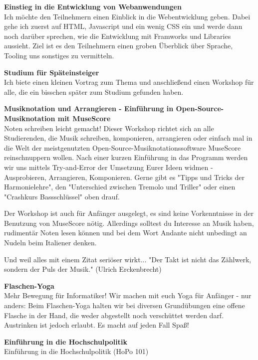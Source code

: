 {    \textbf{Einstieg in die Entwicklung von Webanwendungen}\\
    Ich möchte den Teilnehmern einen Einblick in die Webentwicklung geben. Dabei gehe ich zuerst auf HTML, Javascript und ein wenig CSS ein und werde dann noch darüber sprechen, wie die Entwicklung mit Framworks und Libraries aussieht. Ziel ist es den Teilnehmern einen groben Überblick über Sprache, Tooling uns sonstiges zu vermitteln.

    \textbf{Studium für Späteinsteiger}\\
    Ich biete einen kleinen Vortrag zum Thema und anschließend einen Workshop für alle, die ein bisschen später zum Studium gefunden haben.

    \textbf{Musiknotation und Arrangieren - Einführung in Open-Source-Musiknotation mit MuseScore}\\
    Noten schreiben leicht gemacht! Dieser Workshop richtet sich an alle Studierenden, die Musik schreiben, komponieren, arrangieren oder einfach mal in die Welt der meistgenutzten Open-Source-Musiknotationssoftware MuseScore reinschnuppern wollen. Nach einer kurzen Einführung in das Programm werden wir uns mittels Try-and-Error der Umsetzung Eurer Ideen widmen - Ausprobieren, Arrangieren, Komponieren. Gerne gibt es "Tipps und Tricks der Harmonielehre", den "Unterschied zwischen Tremolo und Triller" oder einen "Crashkurs Bassschlüssel" oben drauf.

    Der Workshop ist auch für Anfänger ausgelegt, es sind keine Vorkenntnisse in der Benutzung von MuseScore nötig. Allerdings solltest du Interesse an Musik haben, rudimentär Noten lesen können und bei dem Wort Andante nicht unbedingt an Nudeln beim Italiener denken.

    Und weil alles mit einem Zitat seriöser wirkt... "Der Takt ist nicht das Zählwerk, sondern der Puls der Musik." (Ulrich Erckenbrecht)

    \textbf{Flaschen-Yoga}\\
    Mehr Bewegung für Informatiker! Wir machen mit euch Yoga für Anfänger - nur anders: Beim Flaschen-Yoga halten wir bei diversen Grundübungen eine offene Flasche in der Hand, die weder abgestellt noch verschüttet werden darf. Austrinken ist jedoch erlaubt. Es macht auf jeden Fall Spaß!



    \textbf{Einführung in die Hochschulpolitik}\\
    Einführung in die Hochschulpolitik (HoPo 101)

}
